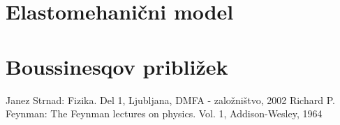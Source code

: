 \documentclass[a4paper, 12pt]{book}
\begin{document}
\section{Elastomehanični model}
\section{Boussinesqov približek}

\begin{thebibliography}{99}
 Janez Strnad: Fizika. Del 1, Ljubljana, DMFA - založništvo, 2002
 Richard P. Feynman: The Feynman lectures on physics. Vol. 1,  Addison-Wesley, 1964
\end{thebibliography}
\end{document}
